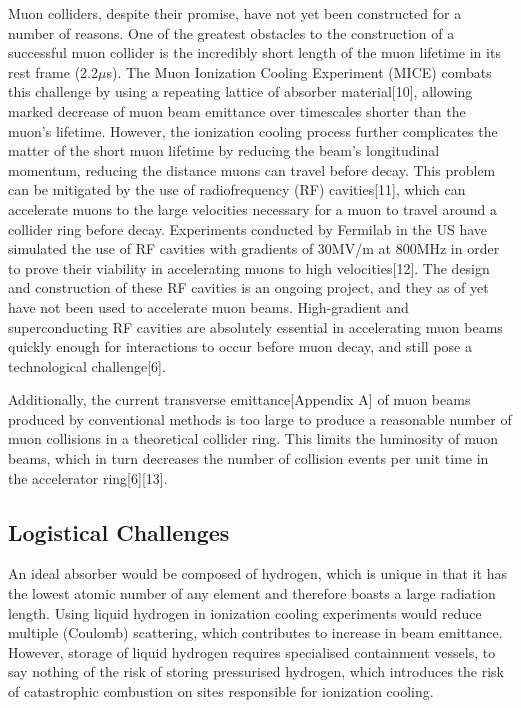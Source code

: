 \documentclass{article}
\begin{document}
	\par Muon colliders, despite their promise, have not yet been constructed for a number of reasons. One of the greatest obstacles to the construction of a successful muon collider is the incredibly short length of the muon lifetime in its rest frame (2.2$\mu$s). The Muon Ionization Cooling Experiment (MICE) combats this challenge by using a repeating lattice of absorber material[10], allowing marked decrease of muon beam emittance over timescales shorter than the muon’s lifetime. However, the ionization cooling process further complicates the matter of the short muon lifetime by reducing the beam’s longitudinal momentum, reducing the distance muons can travel before decay. This problem can be mitigated by the use of radiofrequency (RF) cavities[11], which can accelerate muons to the large velocities necessary for a muon to travel around a collider ring before decay. Experiments conducted by Fermilab in the US have simulated the use of RF cavities with gradients of 30MV/m at 800MHz in order to prove their viability in accelerating muons to high velocities[12]. The design and construction of these RF cavities is an ongoing project, and they as of yet have not been used to accelerate muon beams. High-gradient and superconducting RF cavities are absolutely essential in accelerating muon beams quickly enough for interactions to occur before muon decay, and still pose a technological challenge[6].
	\par Additionally, the current transverse emittance[Appendix A] of muon beams produced by conventional methods is too large to produce a reasonable number of muon collisions in a theoretical collider ring. This limits the luminosity of muon beams, which in turn decreases the number of collision events per unit time in the accelerator ring[6][13].
	
	\subsection{Logistical Challenges}
	
	\par An ideal absorber would be composed of hydrogen, which is unique in that it has the lowest atomic number of any element and therefore boasts a large radiation length. Using liquid hydrogen in ionization cooling experiments would reduce multiple (Coulomb) scattering, which contributes to increase in beam emittance. However, storage of liquid hydrogen requires specialised containment vessels, to say nothing of the risk of storing pressurised hydrogen, which introduces the risk of catastrophic combustion on sites responsible for ionization cooling.
	
\end{document}

